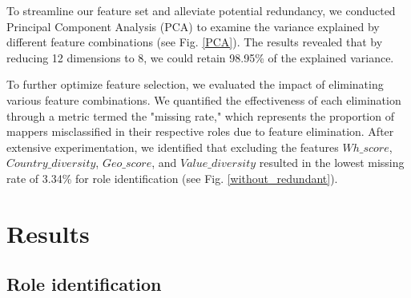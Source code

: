 \documentclass[manuscript,screen,review]{acmart}
\begin{document}
To streamline our feature set and alleviate potential redundancy, we conducted Principal Component Analysis (PCA) to examine the variance explained by different feature combinations (see Fig. \ref{PCA}). The results revealed that by reducing 12 dimensions to 8, we could retain 98.95\% of the explained variance. 

To further optimize feature selection, we evaluated the impact of eliminating various feature combinations. We quantified the effectiveness of each elimination through a metric termed the "missing rate," which represents the proportion of mappers misclassified in their respective roles due to feature elimination. After extensive experimentation, we identified that excluding the features $Wh\_score$, $Country\_diversity$, $Geo\_score$, and $Value\_diversity$ resulted in the lowest missing rate of 3.34\% for role identification (see Fig. \ref{without_redundant}).

\section{Results}

\subsection{Role identification}
\end{document}
